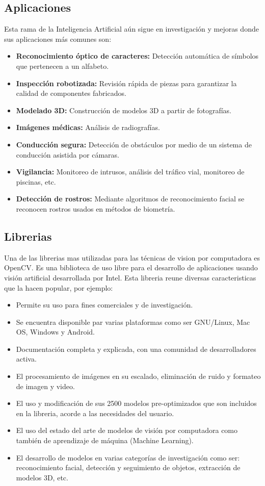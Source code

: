 \subsection{Aplicaciones}
Esta rama de la Inteligencia Artificial aún sigue en investigación y mejoras donde sus aplicaciones más comunes son:

\begin{itemize}
    \item \textbf{Reconocimiento óptico de caracteres:} Detección automática de símbolos que pertenecen a un alfabeto.
    \item \textbf{Inspección robotizada:} Revisión rápida de piezas para garantizar la calidad de componentes fabricados.
    \item \textbf{Modelado 3D:} Construcción de modelos 3D a partir de fotografías.
    \item \textbf{Imágenes médicas:} Análisis de radiografías.
    \item \textbf{Conducción segura:} Detección de obstáculos por medio de un sistema de conducción asistida por cámaras.
    \item \textbf{Vigilancia:} Monitoreo de intrusos, análisis del tráfico vial, monitoreo de piscinas, etc.
    \item \textbf{Detección de rostros:} Mediante algoritmos de reconocimiento facial se reconocen rostros usados en métodos de biometría.
\end{itemize}

\subsection{Librerias}
Una de las librerias mas utilizadas para las técnicas de vision por computadora es OpenCV. Es una biblioteca de uso libre para el desarrollo de aplicaciones usando visión artificial desarrollada por Intel. Esta libreria reune diversas caracteristicas que la hacen popular, por ejemplo: 
\begin{itemize}
    \item Permite su uso para fines comerciales y de investigación.
    \item Se encuentra disponible par varias plataformas como ser GNU/Linux, Mac OS, Windows y Android.
    \item Documentación completa y explicada, con una comunidad de desarrolladores activa.
    \item El procesamiento de imágenes en su escalado, eliminación de ruido y formateo de imagen y video.
    \item El uso y modificación de sus 2500 modelos pre-optimizados que son incluidos en la libreria, acorde a las necesidades del usuario.
    \item El uso del estado del arte de modelos de visión por computadora como también de aprendizaje de máquina (Machine Learning).
    \item El desarrollo de modelos en varias categorías de investigación como ser: reconocimiento facial, detección y seguimiento de objetos, extracción de modelos 3D, etc.
\end{itemize}

